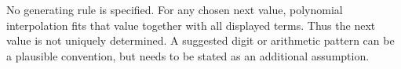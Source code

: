No generating rule is specified. For any chosen next value, polynomial interpolation fits that value together with all displayed terms. Thus the next value is not uniquely determined. A suggested digit or arithmetic pattern can be a plausible convention, but needs to be stated as an additional assumption.
